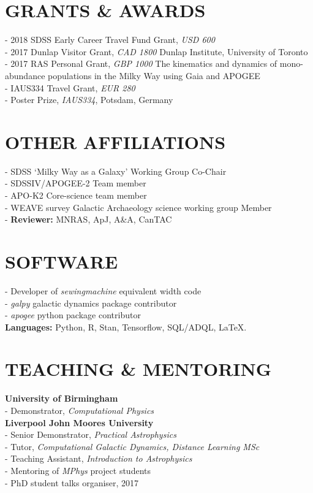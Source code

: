\documentclass[margin]{res}
\begin{document}
\begin{resume}
\section{GRANTS \& AWARDS}
\par- 2018 SDSS Early Career Travel Fund Grant, \emph{USD 600}\\
-  2017 Dunlap Visitor Grant, \emph{CAD 1800} Dunlap Institute, University of Toronto\\
- 2017 RAS Personal Grant, \emph{GBP 1000} The kinematics and dynamics of mono-abundance populations in the Milky Way using Gaia and APOGEE\\
- IAUS334 Travel Grant, \emph{EUR 280}\\
- Poster Prize, \emph{IAUS334}, Potsdam, Germany\\



\section{OTHER AFFILIATIONS}
\par
- SDSS `Milky Way as a Galaxy' Working Group Co-Chair \\
- SDSSIV/APOGEE-2 Team member\\
- APO-K2 Core-science team member\\
- WEAVE survey Galactic Archaeology science working group Member\\
- \textbf{Reviewer:} MNRAS, ApJ, A\&A, CanTAC\\


\section{SOFTWARE}
\par
- Developer of \emph{sewingmachine} equivalent width code\\
- \emph{galpy} galactic dynamics package contributor\\
- \emph{apogee} python package contributor\\
\textbf{Languages:} Python, R, Stan, Tensorflow, SQL/ADQL, \LaTeX.\\

\section{TEACHING \& MENTORING}
\par 
\textbf{University of Birmingham}\\
- Demonstrator, \emph{Computational Physics}\\
\textbf{Liverpool John Moores University}\\
- Senior Demonstrator, \emph{Practical Astrophysics}\\
- Tutor, \emph{Computational Galactic Dynamics, Distance Learning MSc}\\
- Teaching Assistant, \emph{Introduction to Astrophysics}\\
- Mentoring of \emph{MPhys} project students\\
- PhD student talks organiser, 2017


\end{resume}
\end{document}
